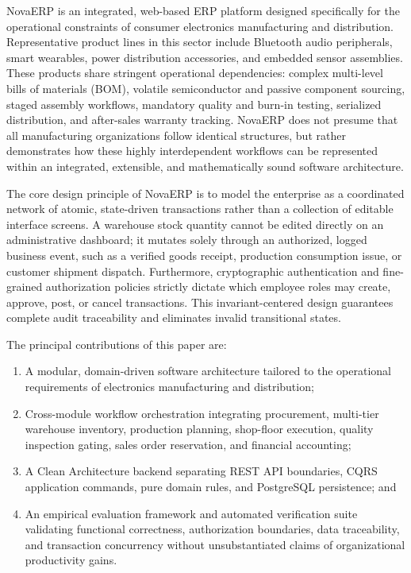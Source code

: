 \documentclass[conference]{IEEEtran}
\begin{document}
NovaERP is an integrated, web-based ERP platform designed specifically for the operational constraints of consumer electronics manufacturing and distribution. Representative product lines in this sector include Bluetooth audio peripherals, smart wearables, power distribution accessories, and embedded sensor assemblies. These products share stringent operational dependencies: complex multi-level bills of materials (BOM), volatile semiconductor and passive component sourcing, staged assembly workflows, mandatory quality and burn-in testing, serialized distribution, and after-sales warranty tracking. NovaERP does not presume that all manufacturing organizations follow identical structures, but rather demonstrates how these highly interdependent workflows can be represented within an integrated, extensible, and mathematically sound software architecture.

The core design principle of NovaERP is to model the enterprise as a coordinated network of atomic, state-driven transactions rather than a collection of editable interface screens. A warehouse stock quantity cannot be edited directly on an administrative dashboard; it mutates solely through an authorized, logged business event, such as a verified goods receipt, production consumption issue, or customer shipment dispatch. Furthermore, cryptographic authentication and fine-grained authorization policies strictly dictate which employee roles may create, approve, post, or cancel transactions. This invariant-centered design guarantees complete audit traceability and eliminates invalid transitional states.

The principal contributions of this paper are:
\begin{enumerate}
    \item A modular, domain-driven software architecture tailored to the operational requirements of electronics manufacturing and distribution;
    \item Cross-module workflow orchestration integrating procurement, multi-tier warehouse inventory, production planning, shop-floor execution, quality inspection gating, sales order reservation, and financial accounting;
    \item A Clean Architecture backend separating REST API boundaries, CQRS application commands, pure domain rules, and PostgreSQL persistence; and
    \item An empirical evaluation framework and automated verification suite validating functional correctness, authorization boundaries, data traceability, and transaction concurrency without unsubstantiated claims of organizational productivity gains.
\end{enumerate}
\end{document}
